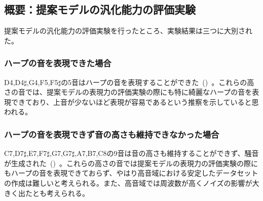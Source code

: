 \subsection{概要：提案モデルの汎化能力の評価実験}

提案モデルの汎化能力の評価実験を行ったところ、実験結果は三つに大別された。

\subsubsection{ハープの音を表現できた場合}

D4,D4$\sharp$,G4,F5,F5$\sharp$の5音はハープの音を表現することができた~()~。これらの高さの音では、提案モデルの表現力の評価実験の際にも特に綺麗なハープの音を表現できており、上音が少ないほど表現が容易であるという推察を示していると思われる。

\subsubsection{ハープの音を表現できず音の高さも維持できなかった場合}

C7,D7$\sharp$,E7,F7$\sharp$,G7,G7$\sharp$,A7,B7,C8の9音は音の高さも維持することができず、騒音が生成された~()~。これらの高さの音では提案モデルの表現力の評価実験の際にもハープの音を表現できておらず、やはり高音域における安定したデータセットの作成は難しいと考えられる。また、高音域では周波数が高くノイズの影響が大きく出たとも考えられる。

